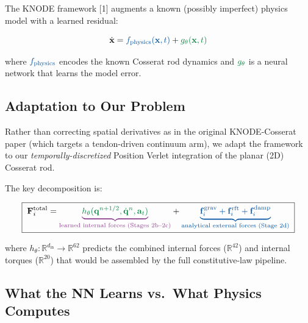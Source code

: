\documentclass[11pt]{article}
\newcommand{\vect}[1]{\mathbf{#1}}
\newcommand{\Real}{\mathbb{R}}
\newcommand{\phys}[1]{{\color{physicsblue}#1}}
\newcommand{\nn}[1]{{\color{nngreen}#1}}
\newcommand{\hyb}[1]{{\color{hybrid}#1}}
\begin{document}
The KNODE framework [1] augments a known (possibly imperfect) physics model with a learned residual:

\begin{equation}
  \dot{\vect{x}} = \phys{f_{\text{physics}}(\vect{x}, t)} + \nn{g_\theta(\vect{x}, t)}
  \label{eq:knode-core}
\end{equation}

\noindent
where $\phys{f_{\text{physics}}}$ encodes the known Cosserat rod dynamics and $\nn{g_\theta}$ is a neural network that learns the model error.

\subsection{Adaptation to Our Problem}

Rather than correcting spatial derivatives as in the original KNODE-Cosserat paper (which targets a tendon-driven continuum arm), we adapt the framework to our \emph{temporally-discretized} Position Verlet integration of the planar (2D) Cosserat rod.

The key decomposition is:

\begin{equation}
  \boxed{\;
  \vect{F}_i^{\text{total}} = \hyb{\underbrace{\nn{h_\theta(\vect{q}^{n+1/2}, \dot{\vect{q}}^n, \vect{a}_t)}}_{\text{learned internal forces (Stages 2b--2c)}}}
  + \phys{\underbrace{\vect{f}_i^{\text{grav}} + \vect{f}_i^{\text{rft}} + \vect{f}_i^{\text{damp}}}_{\text{analytical external forces (Stage 2d)}}}
  \;}
  \label{eq:hybrid-force}
\end{equation}

\noindent
where $h_\theta\colon \Real^{d_{\text{in}}} \to \Real^{62}$ predicts the combined internal forces ($\Real^{42}$) and internal torques ($\Real^{20}$) that would be assembled by the full constitutive-law pipeline.

\subsection{What the NN Learns vs.\ What Physics Computes}
\end{document}
